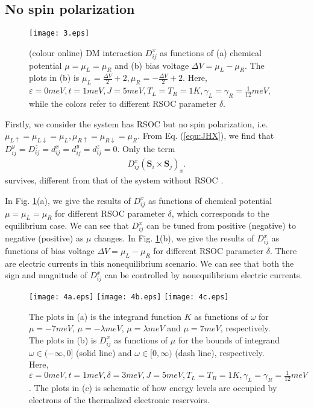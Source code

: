 \documentclass[aps,prb,twocolumn,showpacs,amssymb]{revtex4-1}
\begin{document}
\subsection{No spin polarization}
\begin{figure}[!htp]
\centering
\texttt{[image: 3.eps]}
\vspace{-1.0cm}
\caption{(colour online) DM interaction $D^{x}_{ij}$ as functions of (a) chemical potential $\mu=\mu_L=\mu_R$ and (b) bias voltage ${\Delta}V=\mu_{L}-\mu_{R}$.
The plots in (b) is $\mu_{L}=\frac{{\Delta}V}{2}+2, \mu_{R}=-\frac{{\Delta}V}{2}+2$.
Here, $\varepsilon=0meV,t=1meV,J=5meV,T_L=T_R=1K, \gamma_L=\gamma_R=\frac{1}{12}meV$, while the colors refer to different RSOC parameter $\delta$.}\label{fig:3}
\end{figure}
Firstly, we consider the system has RSOC but no spin polarization, i.e. $\mu_{L\uparrow}=\mu_{L\downarrow}=\mu_L, \mu_{R\uparrow}=\mu_{R\downarrow}=\mu_R$. From Eq. (\ref{equ:JHX}), we find that $D^{y}_{ij}=D^{z}_{ij}=d^{x}_{ij}=d^{y}_{ij}=d^{z}_{ij}=0$.
Only the term
\begin{equation}%
\begin{aligned}
D^x_{ij}(\bm{S}_{i}\times\bm{S}_{j})_x.
\end{aligned}
\end{equation}
survives, different from that of the system without RSOC \cite{Ren2014}.

In Fig. \ref{fig:3}(a), we give the results of $D^{x}_{ij}$ as functions of chemical potential $\mu=\mu_L=\mu_R$ for different RSOC parameter $\delta$, which corresponds to the equilibrium case. We can see that $D^{x}_{ij}$ can be tuned from positive (negative) to negative (positive) as $\mu$ changes.
In Fig. \ref{fig:3}(b), we give the results of $D^{x}_{ij}$ as functions of bias voltage ${\Delta}V=\mu_{L}-\mu_{R}$ for different RSOC parameter $\delta$. There are electric currents in this nonequilibrium scenario. We can see that both the sign and magnitude of $D^{x}_{ij}$ can be controlled by nonequilibrium electric currents.

\begin{figure*}[!htp]
\texttt{[image: 4a.eps]}\hspace{-0.3cm}
\texttt{[image: 4b.eps]}\hspace{-0.5cm}
\texttt{[image: 4c.eps]}
\caption{The plots in (a) is the integrand function $K$ as functions of $\omega$ for $\mu=-7meV$, $\mu=-{\lambda}meV$, $\mu={\lambda}meV$ and $\mu=7meV$, respectively.
The plots in (b) is $D^{x}_{ij}$ as functions of $\mu$ for the bounds of integrand $\omega\in(-\infty,0]$ (solid line) and $\omega\in[0,\infty)$ (dash line), respectively.
Here, $\varepsilon=0meV, t=1meV, \delta=3meV, J=5meV, T_L=T_R=1K, \gamma_L=\gamma_R=\frac{1}{12}meV$.
The plots in (c) is schematic of how energy levels are occupied by electrons of the thermalized electronic reservoirs.}\label{fig:4}
\end{figure*}
\end{document}
